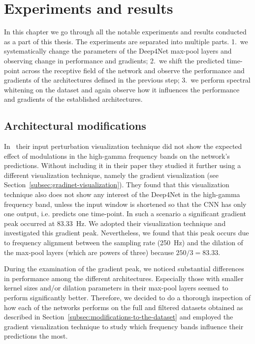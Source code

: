 \chapter{Experiments and results}
\label{ch:exp}
In this chapter we go through all the notable experiments and results conducted as a part of this thesis. 
The experiments are separated into multiple parts.
1.~we systematically change the parameters of the Deep4Net max-pool layers and observing change in performance and gradients; 2.~we shift the predicted time-point across the receptive field of the network and observe the performance and gradients of the architectures defined in the previous step; 3.~we perform spectral whitening on the dataset and again observe how it influences the performance and gradients of the established architectures. 


\section{Architectural modifications}\label{sec:architectural-modifications}
In~\cite{Hammer-2021} their input perturbation visualization technique did not show the expected effect of modulations in the high-gamma frequency bands on the network's predictions.
Without including it in their paper they studied it further using a different visualization technique, namely the gradient visualization (see Section~\ref{subsec:gradinet-visualization}). 
They found that this visualization technique also does not show any interest of the Deep4Net in the high-gamma frequency band, unless the input window is shortened so that the CNN has only one output, i.e. predicts one time-point.
In such a scenario a significant gradient peak occurred at 83.33~Hz.
We adopted their visualization technique and investigated this gradient peak.
Nevertheless, we found that this peak occurs due to frequency alignment between the sampling rate (250~Hz) and the dilation of the max-pool layers (which are powers of three) because $ 250/3 = 83.33$.

During the examination of the gradient peak, we noticed substantial differences in performance among the different architectures.
Especially those with smaller kernel sizes and/or dilation parameters in their max-pool layers seemed to perform significantly better.
Therefore, we decided to do a thorough inspection of how each of the networks performs on the full and filtered datasets obtained as described in Section~\ref{subsec:modifications-to-the-dataset} and employed the gradient visualization technique to study which frequency bands influence their predictions the most.

